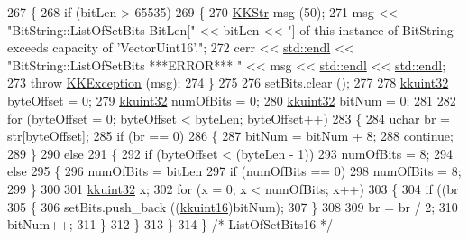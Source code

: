 \begin{DoxyCode}
267 \{
268   \textcolor{keywordflow}{if}  (bitLen > 65535)
269   \{
270     \hyperlink{class_k_k_b_1_1_k_k_str}{KKStr}  msg (50);
271     msg << \textcolor{stringliteral}{"BitString::ListOfSetBits  BitLen["} << bitLen << \textcolor{stringliteral}{"] of this instance of BitString exceeds
       capacity of 'VectorUint16'."};
272     cerr << \hyperlink{namespace_k_k_b_ad1f50f65af6adc8fa9e6f62d007818a8}{std::endl} << \textcolor{stringliteral}{"BitString::ListOfSetBits   ***ERROR***   "} << msg << 
      \hyperlink{namespace_k_k_b_ad1f50f65af6adc8fa9e6f62d007818a8}{std::endl} << \hyperlink{namespace_k_k_b_ad1f50f65af6adc8fa9e6f62d007818a8}{std::endl};
273     \textcolor{keywordflow}{throw} \hyperlink{class_k_k_b_1_1_k_k_exception}{KKException} (msg);
274   \}
275 
276   setBits.clear ();
277 
278   \hyperlink{namespace_k_k_b_af8d832f05c54994a1cce25bd5743e19a}{kkuint32}  byteOffset = 0;
279   \hyperlink{namespace_k_k_b_af8d832f05c54994a1cce25bd5743e19a}{kkuint32}  numOfBits  = 0;
280   \hyperlink{namespace_k_k_b_af8d832f05c54994a1cce25bd5743e19a}{kkuint32}  bitNum     = 0;
281 
282   \textcolor{keywordflow}{for}  (byteOffset = 0;  byteOffset < byteLen;  byteOffset++)
283   \{
284     \hyperlink{namespace_k_k_b_ace9969169bf514f9ee6185186949cdf7}{uchar}  br = str[byteOffset];
285     \textcolor{keywordflow}{if}  (br == 0)
286     \{
287       bitNum = bitNum + 8;
288       \textcolor{keywordflow}{continue};
289     \}
290     \textcolor{keywordflow}{else}
291     \{
292       \textcolor{keywordflow}{if}  (byteOffset < (byteLen - 1))
293         numOfBits = 8;
294       \textcolor{keywordflow}{else}
295       \{
296         numOfBits = bitLen %
297         \textcolor{keywordflow}{if}  (numOfBits == 0)
298           numOfBits = 8;
299       \}
300 
301       \hyperlink{namespace_k_k_b_af8d832f05c54994a1cce25bd5743e19a}{kkuint32} x;
302       \textcolor{keywordflow}{for}  (x = 0;  x < numOfBits;  x++)
303       \{
304         \textcolor{keywordflow}{if}  ((br %
305         \{
306           setBits.push\_back ((\hyperlink{namespace_k_k_b_aa8c7d4d30381c8a0b6fce68974a9c8a9}{kkuint16})bitNum);
307         \}
308 
309         br = br / 2;
310         bitNum++;
311       \}
312     \}
313   \}
314 \}  \textcolor{comment}{/* ListOfSetBits16 */}
\end{DoxyCode}
